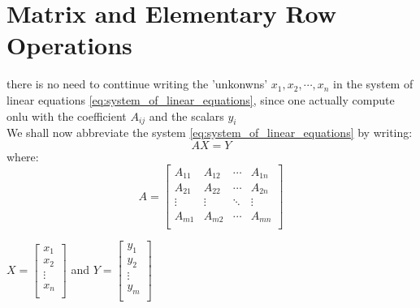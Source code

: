 \documentclass[11pt, a4paper, oneside,UTF8]{ctexbook}
\begin{document}
\section{Matrix and Elementary Row Operations}
there is no need to conttinue writing the 'unkonwns' $x_1,x_2,\cdots,x_n$ in the system of linear equations \ref{eq:system_of_linear_equations},
since one actually compute onlu with the coefficient $A_{ij}$ and the scalars  $y_i$\\
We shall now abbreviate the system \ref{eq:system_of_linear_equations} by writing:
\[
  AX=Y 
\]
where:
\begin{equation}
  A = \begin{bmatrix}
    A_{11} & A_{12} & \cdots & A_{1n} \\
    A_{21} & A_{22} & \cdots & A_{2n} \\
    \vdots & \vdots & \ddots & \vdots \\
    A_{m1} & A_{m2} & \cdots & A_{mn} \\
  \end{bmatrix}
  \label{eq:A equals}
\end{equation}
\begin{center}
   
$
  X = \begin{bmatrix}
    x_1 \\
    x_2 \\
    \vdots \\
    x_n \\
  \end{bmatrix}
$ \quad and \quad $
  Y = \begin{bmatrix}
    y_1 \\
    y_2 \\
    \vdots \\
    y_m \\
  \end{bmatrix}
$
\end{center}



\end{document}
